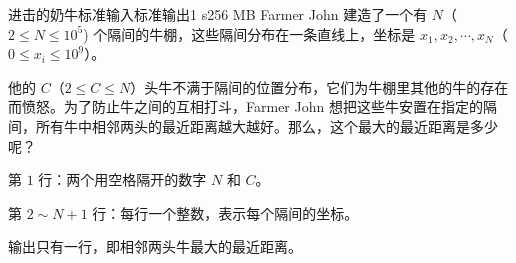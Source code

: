 \begin{problem}{进击的奶牛}{标准输入}{标准输出}{1 s}{256 MB}
Farmer John 建造了一个有 $N$（$2 \leq N \leq 10 ^ 5$) 个隔间的牛棚，这些隔间分布在一条直线上，坐标是 $x _ 1, x _ 2, \cdots, x _ N$（$0 \leq x _ i \leq 10 ^ 9$）。

他的 $C$（$2 \leq C \leq N$）头牛不满于隔间的位置分布，它们为牛棚里其他的牛的存在而愤怒。为了防止牛之间的互相打斗，Farmer John 想把这些牛安置在指定的隔间，所有牛中相邻两头的最近距离越大越好。那么，这个最大的最近距离是多少呢？

\InputFile
第 $1$ 行：两个用空格隔开的数字 $N$ 和 $C$。

第 $2 \sim N+1$ 行：每行一个整数，表示每个隔间的坐标。

\OutputFile
输出只有一行，即相邻两头牛最大的最近距离。

\Example

\begin{example}
\end{example}

\end{problem}
